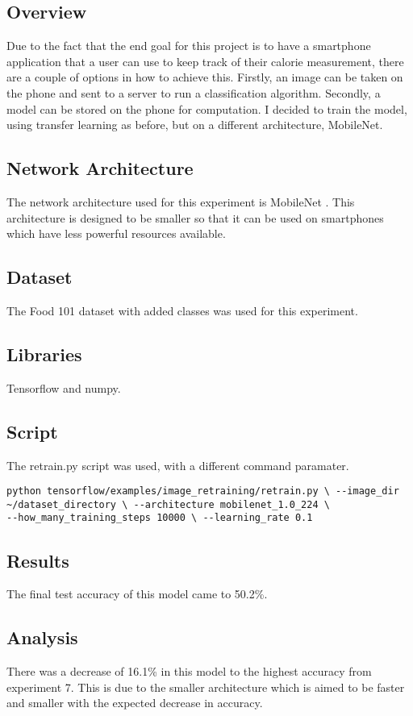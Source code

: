 \subsection*{Overview}
Due to the fact that the end goal for this project is to have a smartphone
application that a user can use to keep track of their calorie measurement,
there are a couple of options in how to achieve this. Firstly, an image can be
taken on the phone and sent to a server to run a classification algorithm.
Secondly, a model can be stored on the phone for computation. I decided to train
the model, using transfer learning as before, but on a different architecture,
MobileNet.

\subsection*{Network Architecture}
The network architecture used for this experiment is MobileNet
\textcite{retrainInception}. This architecture is designed to be smaller so that
it can be used on smartphones which have less powerful resources available.

\subsection*{Dataset}
The Food 101 dataset \textcite{food101} with added classes was used for this experiment.

\subsection*{Libraries}
Tensorflow and numpy.

\subsection*{Script}
The retrain.py script \textcite{retrainInception} was used, with a different
command paramater.

\begin{lstlisting}
python tensorflow/examples/image_retraining/retrain.py \ --image_dir
~/dataset_directory \ --architecture mobilenet_1.0_224 \
--how_many_training_steps 10000 \ --learning_rate 0.1
\end{lstlisting}

\subsection*{Results}
The final test accuracy of this model came to 50.2\%.

\subsection*{Analysis}
There was a decrease of 16.1\% in this model to the highest accuracy from
experiment 7. This is due to the smaller architecture which is aimed to be faster
and smaller with the expected decrease in accuracy.

